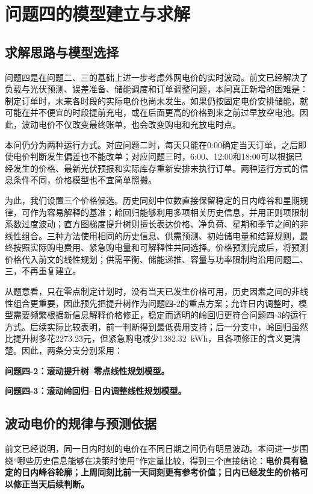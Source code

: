 \documentclass[11pt,a4paper]{article}
\begin{document}
\section{问题四的模型建立与求解}

\subsection{求解思路与模型选择}

问题四是在问题二、三的基础上进一步考虑外网电价的实时波动。前文已经解决了负载与光伏预测、误差准备、储能调度和订单调整问题，本问真正新增的困难是：制定订单时，未来各时段的实际电价也尚未发生。如果仍按固定电价安排储能，就可能在并不便宜的时段提前充电，或在后面更高的价格到来之前过早放空电池。因此，波动电价不仅改变最终账单，也会改变购电和充放电时点。

本问仍分为两种运行方式。对应问题二时，每天只能在0:00确定当天订单，之后即使电价判断发生偏差也不能改单；对应问题三时，6:00、12:00和18:00可以根据已经发生的价格、最新光伏预报和实际库存重新安排未执行订单。两种运行方式的信息条件不同，价格模型也不宜简单照搬。

为此，我们设置三个价格候选。历史同刻中位数直接保留稳定的日内峰谷和星期规律，可作为容易解释的基准；岭回归能够利用多项相关历史信息，并用正则项限制系数过度波动；直方图梯度提升树则擅长表达价格、净负荷、星期和季节之间的非线性组合。三种方法使用相同的历史信息、供需预测、初始储电量和结算规则，最终按照实际购电费用、紧急购电量和可解释性共同选择。价格预测完成后，将预测价格代入前文的线性规划；供需平衡、储能递推、容量与功率限制均沿用问题二、三，不再重复建立。

从题意看，只在零点制定计划时，没有当天已发生价格可用，历史因素之间的非线性组合更重要，因此预先把提升树作为问题四-2的重点方案；允许日内调整时，模型需要频繁根据新信息解释价格修正，稳定而透明的岭回归更符合问题四-3的运行方式。后续实际比较表明，前一判断得到最低费用支持；后一分支中，岭回归虽然比提升树多花2273.23元，但紧急购电减少1382.32~kWh，且各项修正的含义更清楚。因此，两条分支分别采用：

\textbf{问题四-2：滚动提升树--零点线性规划模型。}

\textbf{问题四-3：滚动岭回归--日内调整线性规划模型。}

\subsection{波动电价的规律与预测依据}

前文已经说明，同一日内时刻的电价在不同日期之间仍有明显波动。本问进一步围绕“哪些历史信息能够在决策时使用”作定量比较，得到三个直接结论：\textbf{电价具有稳定的日内峰谷轮廓；上周同刻比前一天同刻更有参考价值；日内已经发生的价格可以修正当天后续判断。}
\end{document}
